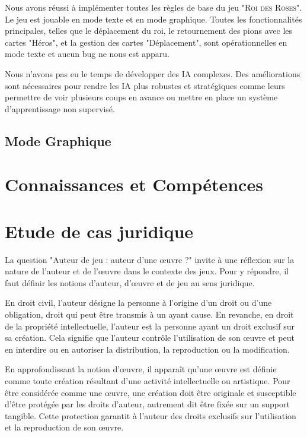 Nous avons réussi à implémenter toutes les règles de base du jeu "\textsc{Roi des Roses}". Le jeu est jouable en mode texte et en mode graphique. Toutes les fonctionnalités principales, telles que le déplacement du roi, le retournement des pions avec les cartes "Héros", et la gestion des cartes "Déplacement", sont opérationnelles en mode texte et aucun bug ne nous est apparu.

Nous n'avons pas eu le temps de développer des IA complexes. Des améliorations sont nécessaires pour rendre les IA plus robustes et stratégiques comme leurs permettre de voir plusieurs coups en avance ou mettre en place un système d'apprentissage non supervisé.

\subsection*{Mode Graphique}

\section{Connaissances et Compétences}

\section{Etude de cas juridique}

La question "Auteur de jeu : auteur d'une œuvre ?" invite à une réflexion sur la nature de l'auteur et de l'œuvre dans le contexte des jeux. Pour y répondre, il faut définir les notions d'auteur, d'œuvre et de jeu au sens juridique.

En droit civil, l'auteur désigne la personne à l'origine d'un droit ou d'une obligation, droit qui peut être transmis à un ayant cause. En revanche, en droit de la propriété intellectuelle, l'auteur est la personne ayant un droit exclusif sur sa création. Cela signifie que l'auteur contrôle l'utilisation de son œuvre et peut en interdire ou en autoriser la distribution, la reproduction ou la modification.

En approfondissant la notion d'œuvre, il apparaît qu'une œuvre est définie comme toute création résultant d'une activité intellectuelle ou artistique. Pour être considérée comme une œuvre, une création doit être originale et susceptible d'être protégée par les droits d'auteur, autrement dit être fixée sur un support tangible. Cette protection garantit à l'auteur des droits exclusifs sur l'utilisation et la reproduction de son œuvre.

